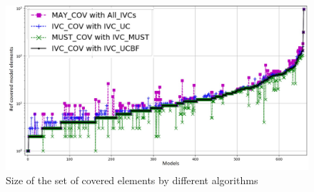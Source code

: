 \begin{figure}
  \centering
  \includegraphics[width=\columnwidth]{figs/cv_size.jpg}
  \caption{Size of the set of covered elements by different algorithms}\label{fig:cvsize}
\end{figure}


